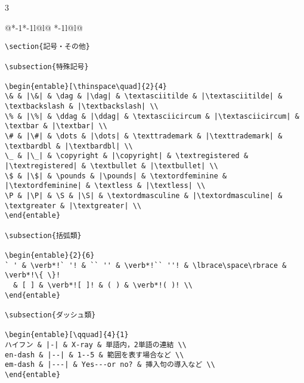 \documentclass[10pt,a4paper,landscape,dvipdfmx]{jarticle}
\makeatletter
\def\set@etsep#1#2{\def\etcolsep{#1}\def\etitemsep{#2}}
\newenvironment{entable}[3][\quad\qquad]{%
  \set@etsep#1\relax\relax
  \begin{tabular}{%
    @{}*{\the\numexpr#3-1}{*{\the\numexpr#2-1}{l@{\etcolsep}}l@{\etitemsep}}%
    *{\the\numexpr#2-1}{l@{\etcolsep}}l@{}}}{%
  \end{tabular}}
\let\lbrace\{ \let\rbrace\}
\makeatother
\begin{document}
\begin{multicols}{3}
\begin{entable}[\enspace]{2}{1}
\begin{verbatim}
\section{記号・その他}

\subsection{特殊記号}

\begin{entable}[\thinspace\quad]{2}{4}
\& & |\&| & \dag & |\dag| & \textasciitilde & |\textasciitilde| & \textbackslash & |\textbackslash| \\
\% & |\%| & \ddag & |\ddag| & \textasciicircum & |\textasciicircum| & \textbar & |\textbar| \\
\# & |\#| & \dots & |\dots| & \texttrademark & |\texttrademark| & \textbardbl & |\textbardbl| \\
\_ & |\_| & \copyright & |\copyright| & \textregistered & |\textregistered| & \textbullet & |\textbullet| \\
\$ & |\$| & \pounds & |\pounds| & \textordfeminine & |\textordfeminine| & \textless & |\textless| \\
\P & |\P| & \S & |\S| & \textordmasculine & |\textordmasculine| & \textgreater & |\textgreater| \\
\end{entable}

\subsection{括弧類}

\begin{entable}{2}{6}
` ' & \verb*!` '! & `` '' & \verb*!`` ''! & \lbrace\space\rbrace & \verb*!\{ \}!
  & [ ] & \verb*![ ]! & ( ) & \verb*!( )! \\
\end{entable}

\subsection{ダッシュ類}

\begin{entable}[\qquad]{4}{1}
ハイフン & |-| & X-ray & 単語内，2単語の連結 \\
en-dash & |--| & 1--5 & 範囲を表す場合など \\
em-dash & |---| & Yes---or no? & 挿入句の導入など \\
\end{entable}


\end{verbatim}
\end{entable}
\end{multicols}
\end{document}
